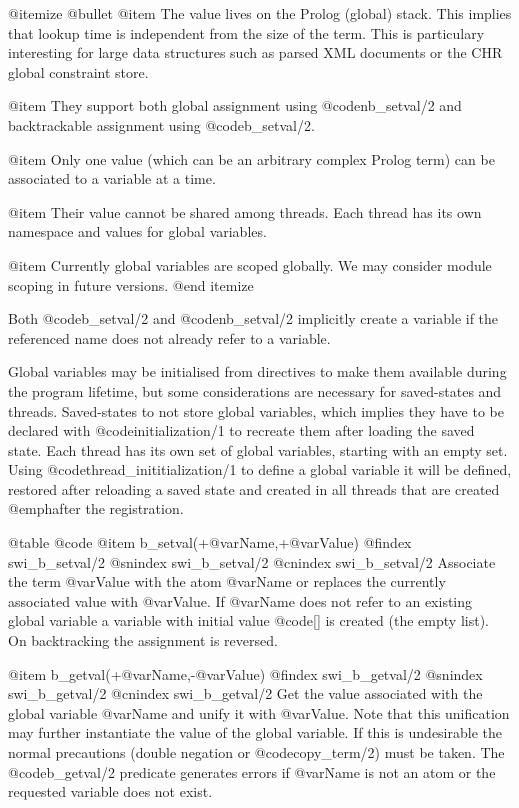@itemize @bullet
@item The value lives on the Prolog (global) stack.  This implies 
          that lookup time is independent from the size of the term.
	  This is particulary interesting for large data structures
	  such as parsed XML documents or the CHR global constraint
	  store.

@item They support both global assignment using @code{nb_setval/2} and
          backtrackable assignment using @code{b_setval/2}.

@item Only one value (which can be an arbitrary complex Prolog
   	  term) can be associated to a variable at a time.

@item Their value cannot be shared among threads.  Each thread
          has its own namespace and values for global variables.

@item Currently global variables are scoped globally.  We may
          consider module scoping in future versions.
@end itemize

Both @code{b_setval/2} and @code{nb_setval/2} implicitly create a variable if the
referenced name does not already refer to a variable.

Global variables may be initialised from directives to make them
available during the program lifetime, but some considerations are
necessary for saved-states and threads. Saved-states to not store global
variables, which implies they have to be declared with @code{initialization/1}
to recreate them after loading the saved state.  Each thread has
its own set of global variables, starting with an empty set.  Using
@code{thread_inititialization/1} to define a global variable it will be
defined, restored after reloading a saved state and created in all
threads that are created @emph{after} the registration.


@table @code
@item b_setval(+@var{Name},+@var{Value})
@findex swi_b_setval/2
@snindex swi_b_setval/2
@cnindex swi_b_setval/2
Associate the term @var{Value} with the atom @var{Name} or replaces
the currently associated value with @var{Value}.  If @var{Name} does
not refer to an existing global variable a variable with initial value
@code{[]} is created (the empty list).  On backtracking the
assignment is reversed.

@item b_getval(+@var{Name},-@var{Value})
@findex swi_b_getval/2
@snindex swi_b_getval/2
@cnindex swi_b_getval/2
Get the value associated with the global variable @var{Name} and unify
it with @var{Value}. Note that this unification may further instantiate
the value of the global variable. If this is undesirable the normal
precautions (double negation or @code{copy_term/2}) must be taken. The
@code{b_getval/2} predicate generates errors if @var{Name} is not an atom or
the requested variable does not exist.

